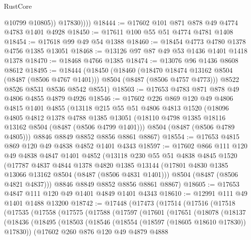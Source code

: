 \begin{lexlean}{RustCore}
\begin{coremodule}
                @10799
                @10805))
            @17830))))
@18444 := @17602 @101 @871 @878 @49 @4774 @4783 @1401 @4928
@18450 := @17611 @100 @55 @51 @4774 @4781 @1408
@18454 := @17618 @99 @49 @54 @1388
@18460 := @18454 @4773 @4780 @1378 @4756 @1385 @13051
@18468 := @13126 @97 @87 @49 @53 @1436 @1401 @1418 @1378
@18470 := @18468 @4766 @1385
@18474 := @13076 @96 @1436 @8608 @8612
@18495 := @18444
    (@18450
      (@18460
        (@18470 @18474 @13162 @8504 (@8487 (@8506 @4767 @1401)))
        @8504
        (@8487 (@8506 @4757 @4773)))
      @8522
      @8526
      @8531
      @8536
      @8542
      @8551)
@18503 := @17653 @4783 @871 @878 @49 @4806 @4855 @4879 @4926
@18546 := @17602
    @226
    @869
    @120
    @49
    @4806
    @4815
    @1401
    @4855
    (@13118
      @215
      @55
      @51
      @4806
      @4813
      @1520
      (@18096
        @4805
        @4812
        @1378
        @4788
        @1385
        @13051
        (@18110 @4798 @1385 @18116 @13162 @8504 (@8487 (@8506 @4799 @1401)))
        @8504
        (@8487 (@8506 @4789 @4805)))
      @8846
      @8849
      @8852
      @8856
      @8861
      @8867)
@18554 := @17653 @4815 @869 @120 @49 @4838 @4852 @1401 @4343
@18597 := @17602
    @866
    @111
    @120
    @49
    @4838
    @4847
    @1401
    @4852
    (@13118
      @230
      @55
      @51
      @4838
      @4845
      @1520
      (@17787
        @4837
        @4844
        @1378
        @4820
        @1385
        @13144
        (@17801 @4830 @1385 @13066 @13162 @8504 (@8487 (@8506 @4831 @1401)))
        @8504
        (@8487 (@8506 @4821 @4837)))
      @8846
      @8849
      @8852
      @8856
      @8861
      @8867)
@18605 := @17653 @4847 @111 @120 @49 @1401 @4849 @1401 @4343
@18610 := @12991 @111 @49 @1401 @1488 @13200
@18742 := @17448
    (@17473
      (@17514
        (@17516
          (@17518
            (@17535
              (@17558
                (@17575
                  (@17588
                    (@17597
                      (@17601
                        (@17651
                          (@18078
                            (@18137
                              (@18436
                                (@18495
                                  (@18503
                                    (@18546 (@18554 (@18597 (@18605 @18610 @17830)) @17830))
                                    (@17602
                                      @260
                                      @876
                                      @120
                                      @49
                                      @4879
                                      @4888

\end{coremodule}
\end{lexlean}
